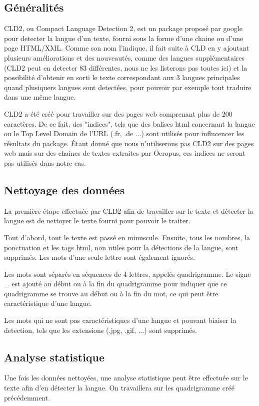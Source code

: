 \subsection{Généralités}
	CLD2, ou Compact Language Detection 2, est un package proposé par google \cite{googleCodeCLD2} pour detecter la langue d'un texte, fourni sous la forme d'une chaine ou d'une page HTML/XML. Comme son nom l'indique, il fait suite à CLD en y ajoutant plusieurs améliorations et des nouveautés, comme des langues supplémentaires (CLD2 peut en detecter 83 différentes, nous ne les listerons pas toutes ici) et la possibilité d'obtenir en sorti le texte correspondant aux 3 langues principales quand plusiquers langues sont detectées, pour pouvoir par exemple tout traduire dans une même langue.

	CLD2 a été créé pour travailler sur des pages web comprenant plus de 200 caractères. De ce fait, des "indices", tels que des balises html concernant la langue ou le Top Level Domain de l'URL (.fr, .de ...) sont utilisés pour influcencer les résultats du package. Étant donné que nous n'utiliserons pas CLD2 sur des pages web mais sur des chaines de textes extraites par Ocropus, ces indices ne seront pas utilisés dans notre cas.

\subsection{Nettoyage des données}
	La première étape effectuée par CLD2 afin de travailler sur le texte et détecter la langue est de nettoyer le texte fourni pour pouvoir le traiter. 

	Tout d'abord, tout le texte est passé en minuscule. Ensuite, tous les nombres, la ponctuation et les tags html, non utiles pour la détections de la langue, sont supprimés. Les mots d'une seule lettre sont également ignorés. 

	Les mots sont séparés en séquences de 4 lettres, appelés quadrigramme. Le signe \_ est ajouté au début ou à la fin du quadrigramme pour indiquer que ce quadrigramme se trouve au début ou à la fin du mot, ce qui peut être caractéristique d'une langue.

	Les mots qui ne sont pas caractéristiques d'une langue et pouvant biaiser la detection, tels que les extensions (.jpg, .gif, ...) sont supprimés.

\subsection{Analyse statistique}
	Une fois les données nettoyées, une analyse statistique peut être effectuée sur le texte afin d'en détecter la langue. On travaillera sur les quadrigramme créé précédemment.

